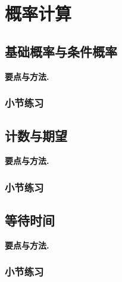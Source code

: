 \chapter{概率计算}

\section{基础概率与条件概率}
\noindent\textbf{要点与方法.}\enspace











\par{}
\subsection*{小节练习}



\section{计数与期望}
\noindent\textbf{要点与方法.}\enspace















\par{}
\subsection*{小节练习}




\section{等待时间}
\noindent\textbf{要点与方法.}\enspace










\par{}
\subsection*{小节练习}



